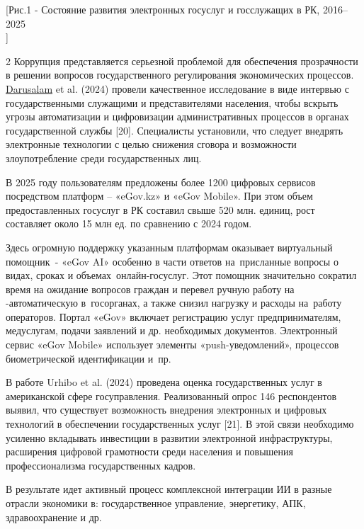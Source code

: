 [Рис.1 - Состояние развития электронных госуслуг и
госслужащих в РК, 2016--2025\\]

\begin{multicols}{2}
Коррупция представляется серьезной проблемой для обеспечения
прозрачности в решении вопросов государственного регулирования
экономических процессов.
\href{https://www.researchgate.net/scientific-contributions/Darusalam-Darusalam-2146395918?_tp=eyJjb250ZXh0Ijp7ImZpcnN0UGFnZSI6ImNpdGF0aW9uRG93bmxvYWQiLCJwYWdlIjoicHVibGljYXRpb24ifX0}{Darusalam}
et al. (2024) провели качественное исследование в виде интервью с
государственными служащими и представителями населения, чтобы вскрыть
угрозы автоматизации и цифровизации административных процессов в органах
государственной службы {[}20{]}. Специалисты установили, что следует
внедрять электронные технологии с целью снижения сговора и возможности
злоупотребление среди государственных лиц.

В 2025 году пользователям предложены более 1200 цифровых сервисов
посредством платформ -- «eGov.kz» и «eGov Mobile». При этом объем
предоставленных госуслуг в РК составил свыше 520 млн. единиц, рост
составляет около 15 млн ед. по сравнению с 2024 годом.

Здесь огромную поддержку указанным платформам оказывает виртуальный
помощник~- «eGov AI» особенно в части ответов на~присланные вопросы о
видах, сроках и объемах~онлайн-госуслуг. Этот помощник значительно
сократил время на ожидание вопросов граждан и перевел ручную работу на
-автоматическую в~госорганах, а также снизил нагрузку и расходы
на~работу операторов. Портал «eGov» включает регистрацию услуг
предпринимателям, медуслугам, подачи заявлений и др. необходимых
документов. Электронный сервис «eGov Mobile» использует элементы
«push-уведомлений», процессов биометрической идентификации и~пр.

В работе Urhibo et al. (2024) проведена оценка государственных услуг в
американской сфере госуправления. Реализованный опрос 146 респондентов
выявил, что существует возможность внедрения электронных и цифровых
технологий в обеспечении государственных услуг {[}21{]}. В этой связи
необходимо усиленно вкладывать инвестиции в развитии электронной
инфраструктуры, расширения цифровой грамотности среди населения и
повышения профессионализма государственных кадров.

В результате идет активный процесс комплексной интеграции ИИ в разные
отрасли экономики в: государственное управление, энергетику, АПК,
здравоохранение и др.


\end{multicols}

